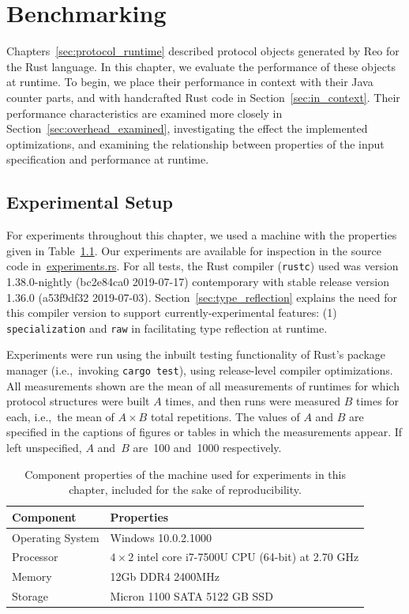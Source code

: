 \chapter{Benchmarking}
\label{sec:benchmarking}

Chapters~\ref{sec:protocol_runtime} described protocol objects generated by Reo for the Rust language. In this chapter, we evaluate the performance of these objects at runtime. To begin, we place their performance in context with their Java counter parts, and with handcrafted Rust code in Section~\ref{sec:in_context}. Their performance characteristics are examined more closely in Section~\ref{sec:overhead_examined}, investigating the effect the implemented optimizations, and examining the relationship between properties of the input specification and performance at runtime.

\section{Experimental Setup}
For experiments throughout this chapter, we used a machine with the properties given in Table~\ref{tab:nomad}. Our experiments are available for inspection in the source code in~\url{experiments.rs}. For all tests, the Rust compiler (\texttt{rustc}) used was version 1.38.0-nightly (bc2e84ca0 2019-07-17) contemporary with stable release version 1.36.0 (a53f9df32 2019-07-03). Section~\ref{sec:type_reflection} explains the need for this compiler version to support currently-experimental features: (1) \texttt{specialization} and \texttt{raw} in facilitating type reflection at runtime.

Experiments were run using the inbuilt testing functionality of Rust's package manager (i.e.,\ invoking \texttt{cargo test}), using release-level compiler optimizations. All measurements shown are the mean of all measurements of runtimes for which protocol structures were built $A$ times, and then runs were measured $B$ times for each, i.e.,\ the mean of $A\times{}B$ total repetitions. The values of $A$ and $B$ are specified in the captions of figures or tables in which the measurements appear. If left unspecified, $A$ and~$B$ are~100 and~1000 respectively.

\begin{table}[]
	\begin{tabular}{l|l}
		Component & Properties \\ \hline
		Operating System 	& Windows 10.0.2.1000 \\
		Processor	& $4\times{2}$ intel core i7-7500U CPU (64-bit) at 2.70 GHz \\
		Memory 	& 12Gb  DDR4 2400MHz \\
		Storage & Micron 1100 SATA 5122 GB SSD  \\
		
	\end{tabular}
	\caption{Component properties of the machine used for experiments in this chapter, included for the sake of reproducibility.}
	\label{tab:nomad}
\end{table}

